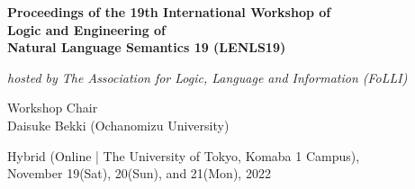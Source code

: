 \documentclass[12pt]{jarticle}
\begin{document}
\pagestyle{empty}

\vspace*{1cm}
\begin{Large}
\begin{center}
{\bf Proceedings of the 19th International Workshop of \\
     Logic and Engineering of \\Natural Language Semantics 19 (LENLS19)}
\end{center}
\end{Large}
\vspace*{1cm}
\begin{Large}
\begin{center}
{\em hosted by The Association for Logic, Language and Information (FoLLI)}
\end{center}
\end{Large}
\begin{large}
\vspace*{1cm}
\begin{center}
Workshop Chair\\ $\;$\\
Daisuke Bekki (Ochanomizu University)
\end{center}
\end{large}
\vspace*{3cm}
\vspace*{1cm}
\begin{large}
\begin{center}
Hybrid (Online | The University of Tokyo, Komaba 1 Campus), \\
November 19(Sat), 20(Sun), and 21(Mon), 2022
\end{center}
\end{large}
\vfill

\newpage

\vspace*{20cm}
\vfill
\begin{large}

\end{large}

\newpage
\pagestyle{plain}
\end{document}
